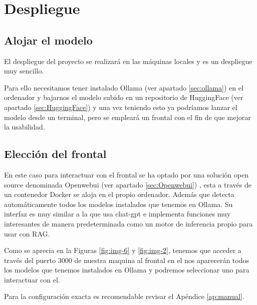 \chapter{Despliegue}

\section{Alojar el modelo}

El despliegue del proyecto se realizará en las máquinas locales y es un despliegue muy sencillo.

Para ello necesitamos tener instalado Ollama (ver apartado \ref{sec:ollama}) en el ordenador \cite{Ollama} y bajarnos el modelo subido en un repositorio de HuggingFace (ver apartado \ref{sec:HuggingFace}) \cite{HuggingFace} y  una vez  teniendo esto ya podríamos lanzar el modelo desde un terminal, pero se empleará un frontal con el fin de que mejorar la usabilidad.

\section{Elección del frontal}

En este caso para interactuar con el frontal se ha optado por una solución open source denominada Openwebui (ver apartado \ref{sec:Openwebui}) \cite{openwebui}, esta a través de un contenedor Docker se aloja en el propio ordenador. Además que detecta automáticamente todos los modelos instalados que tenemos en Ollama. Su interfaz es muy similar a la que usa chat-gpt e implementa funciones muy interesantes de manera predeterminada como un motor de inferencia propio para usar con RAG.

Como se aprecia en la Figuras \ref{fig:img-6} y \ref{fig:img-2}, tenemos que acceder a través del puerto 3000 de nuestra maquina al frontal en el nos aparecerán todos los modelos que tenemos instalados en Ollama y podremos seleccionar uno para interactuar con el.



Para la configuración exacta es recomendable revisar el Apéndice \ref{ap:manual}.

